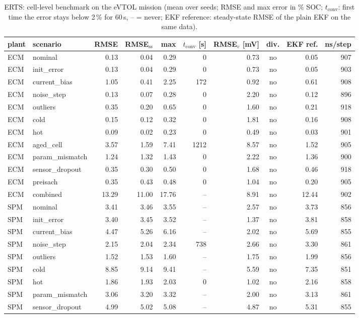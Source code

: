 \begin{table}[H]\centering\footnotesize\setlength{\tabcolsep}{4pt}
\caption{ERTS: cell-level benchmark on the eVTOL mission (mean over seeds; RMSE and max error in \% SOC; $t_\mathrm{conv}$: first time the error stays below 2\,\% for 60\,s, -- = never; EKF reference: steady-state RMSE of the plain EKF on the same data).}\label{tab:cell_ERTS}
\begin{tabular}{llrrrrrcrr}\toprule
plant & scenario & RMSE & RMSE$_\mathrm{ss}$ & max & $t_\mathrm{conv}$ [s] & RMSE$_v$ [mV] & div. & EKF ref. & ns/step \\ \midrule
ECM & nominal & 0.13 & 0.04 & 0.29 & 0 & 0.73 & no & 0.05 & 907 \\
ECM & init\_error & 0.13 & 0.04 & 0.29 & 0 & 0.73 & no & 0.05 & 903 \\
ECM & current\_bias & 1.05 & 0.41 & 2.25 & 172 & 0.92 & no & 0.61 & 908 \\
ECM & noise\_step & 0.13 & 0.07 & 0.28 & 0 & 2.20 & no & 0.12 & 896 \\
ECM & outliers & 0.35 & 0.20 & 0.65 & 0 & 1.60 & no & 0.21 & 918 \\
ECM & cold & 0.15 & 0.12 & 0.32 & 0 & 1.81 & no & 0.16 & 908 \\
ECM & hot & 0.09 & 0.02 & 0.23 & 0 & 0.49 & no & 0.03 & 901 \\
ECM & aged\_cell & 3.57 & 1.59 & 7.41 & 1212 & 8.57 & no & 1.52 & 905 \\
ECM & param\_mismatch & 1.24 & 1.32 & 1.43 & 0 & 2.22 & no & 1.36 & 900 \\
ECM & sensor\_dropout & 0.35 & 0.30 & 0.50 & 0 & 1.68 & no & 0.46 & 918 \\
ECM & preisach & 0.35 & 0.43 & 0.48 & 0 & 1.04 & no & 0.20 & 905 \\
ECM & combined & 13.29 & 11.00 & 17.76 & -- & 8.91 & no & 12.44 & 902 \\
\midrule
SPM & nominal & 3.41 & 3.46 & 3.55 & -- & 2.57 & no & 3.73 & 856 \\
SPM & init\_error & 3.40 & 3.45 & 3.52 & -- & 1.37 & no & 3.81 & 858 \\
SPM & current\_bias & 4.47 & 5.26 & 6.16 & -- & 2.02 & no & 5.69 & 855 \\
SPM & noise\_step & 2.15 & 2.04 & 2.34 & 738 & 2.66 & no & 3.30 & 861 \\
SPM & outliers & 1.52 & 1.53 & 1.60 & -- & 1.75 & no & 1.99 & 856 \\
SPM & cold & 8.85 & 9.14 & 9.41 & -- & 5.59 & no & 7.35 & 851 \\
SPM & hot & 1.86 & 1.93 & 2.03 & 0 & 1.02 & no & 2.16 & 858 \\
SPM & param\_mismatch & 3.06 & 3.20 & 3.32 & -- & 2.00 & no & 3.13 & 861 \\
SPM & sensor\_dropout & 4.99 & 5.02 & 5.08 & -- & 4.87 & no & 5.31 & 855 \\
\bottomrule\end{tabular}\end{table}
